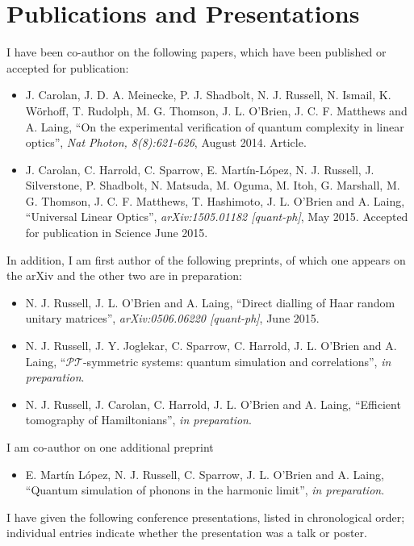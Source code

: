 \chapter{Publications and Presentations}
\label{app:publications}
I have been co-author on the following papers, which have been published or
accepted for publication:
\begin{itemize}
  \item J. Carolan, J. D. A. Meinecke, P. J. Shadbolt, N. J. Russell, N. Ismail,
    K. W\"orhoff, T. Rudolph, M. G. Thomson, J. L. O'Brien, J. C. F. Matthews
    and A. Laing, ``On the experimental verification of quantum complexity in
    linear optics'', \textit{Nat Photon, 8(8):621-626}, August 2014. Article.
  \item J. Carolan, C. Harrold, C. Sparrow, E. Mart\'in-L\'opez, N. J. Russell,
    J. Silverstone, P. Shadbolt, N. Matsuda, M. Oguma, M. Itoh, G. Marshall, M.
    G. Thomson, J. C. F. Matthews, T. Hashimoto, J. L. O'Brien and A. Laing,
    ``Universal Linear Optics'', \textit{arXiv:1505.01182 [quant-ph]}, May 2015.
    Accepted for publication in Science June 2015.
\end{itemize}
In addition, I am first author of the following preprints, of which one appears
on the arXiv and the other two are in preparation:
\begin{itemize}
  \item N. J. Russell, J. L. O'Brien and A. Laing, ``Direct dialling of Haar
    random unitary matrices'', \textit{arXiv:0506.06220 [quant-ph]}, June 2015.
  \item N. J. Russell, J. Y. Joglekar, C. Sparrow, C. Harrold, J. L. O'Brien and
    A. Laing, ``\(\mathcal{PT}\)-symmetric systems: quantum simulation and
    correlations'', \textit{in preparation}.
  \item N. J. Russell, J. Carolan, C. Harrold, J. L. O'Brien and A. Laing,
    ``Efficient tomography of Hamiltonians'', \textit{in preparation}.
\end{itemize}
I am co-author on one additional preprint
\begin{itemize}
  \item E. Mart\'in L\'opez, N. J. Russell, C. Sparrow, J. L. O'Brien and A.
    Laing, ``Quantum simulation of phonons in the harmonic limit'',
    \textit{in preparation}.
\end{itemize}
I have given the following conference presentations, listed in chronological
order; individual entries indicate whether the presentation was a talk or
poster.
